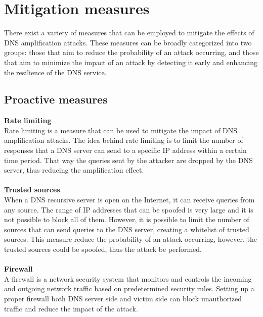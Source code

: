 \section{Mitigation measures}
There exist a variety of measures that can be employed to mitigate the effects of DNS amplification attacks. 
These measures can be broadly categorized into two groups: those that aim to reduce the probability of an attack occurring, and 
those that aim to minimize the impact of an attack by detecting it early and enhancing the resilience of the DNS service.

\subsection{Proactive measures}
\textbf{Rate limiting}\\
Rate limiting is a measure that can be used to mitigate the impact of DNS amplification attacks. The idea behind rate limiting is to limit 
the number of responses that a DNS server can send to a specific IP address within a certain time period. That way the queries sent
by the attacker are dropped by the DNS server, thus reducing the amplification effect.\\
\\
\textbf{Trusted sources}\\
When a DNS recursive server is open on the Internet, it can receive queries from any source. The range of IP addresses that can 
be spoofed is very large and it is not possible to block all of them. However, it is possible to limit the number of sources that can
send queries to the DNS server, creating a whitelist of trusted sources. This measure reduce the probability of an attack occurring, however,
the trusted sources could be spoofed, thus the attack be performed.\\
\\
\textbf{Firewall}\\
A firewall is a network security system that monitors and controls the incoming and outgoing network traffic based on predetermined security
rules. Setting up a proper firewall both DNS server side and victim side can block unauthorized traffic and reduce the impact of the attack.


